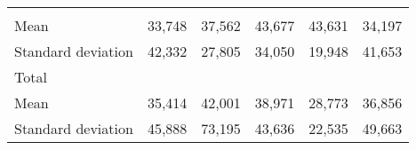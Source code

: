 \begin{tabular}{llllll}
  \multicolumn{1}{|r}{} &
  \multicolumn{1}{r}{} &
  \multicolumn{1}{r}{} &
  \multicolumn{1}{r}{} &
  \multicolumn{1}{r}{} \\
\multicolumn{1}{l}{\hspace{4em}Mean} &
  \multicolumn{1}{|r}{33,748} &
  \multicolumn{1}{r}{37,562} &
  \multicolumn{1}{r}{43,677} &
  \multicolumn{1}{r}{43,631} &
  \multicolumn{1}{r}{34,197} \\
\multicolumn{1}{l}{\hspace{4em}Standard deviation} &
  \multicolumn{1}{|r}{42,332} &
  \multicolumn{1}{r}{27,805} &
  \multicolumn{1}{r}{34,050} &
  \multicolumn{1}{r}{19,948} &
  \multicolumn{1}{r}{41,653} \\
\multicolumn{1}{l}{\hspace{3em}Total} &
  \multicolumn{1}{|r}{} &
  \multicolumn{1}{r}{} &
  \multicolumn{1}{r}{} &
  \multicolumn{1}{r}{} &
  \multicolumn{1}{r}{} \\
\multicolumn{1}{l}{\hspace{4em}Mean} &
  \multicolumn{1}{|r}{35,414} &
  \multicolumn{1}{r}{42,001} &
  \multicolumn{1}{r}{38,971} &
  \multicolumn{1}{r}{28,773} &
  \multicolumn{1}{r}{36,856} \\
\multicolumn{1}{l}{\hspace{4em}Standard deviation} &
  \multicolumn{1}{|r}{45,888} &
  \multicolumn{1}{r}{73,195} &
  \multicolumn{1}{r}{43,636} &
  \multicolumn{1}{r}{22,535} &
  \multicolumn{1}{r}{49,663} \\
\cline{1-6}
\end{tabular}

